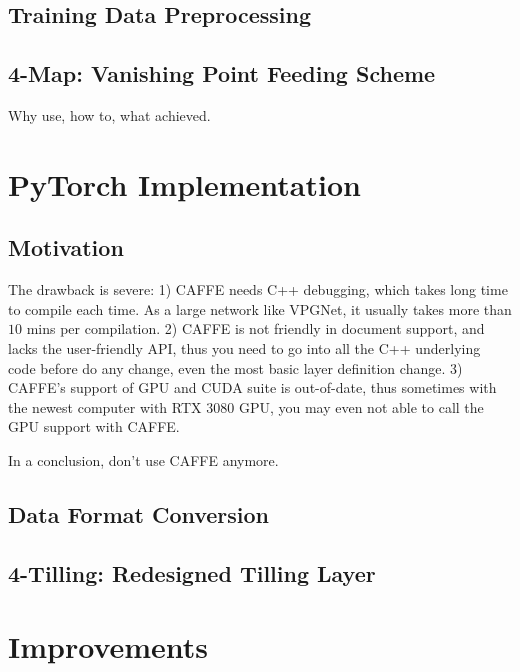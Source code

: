 \begin{spacing}{1.5}
\subsection{Training Data Preprocessing}



\subsection{4-Map: Vanishing Point Feeding Scheme}
\label{subsec:fourmap}

Why use, how to, what achieved.

\section{PyTorch Implementation}
\label{sec:MD_PyTorch}

\subsection{Motivation}

The drawback is severe: 1) CAFFE needs C++ debugging, which takes long time to compile each time. As a large network like VPGNet, it usually takes more than $10$ mins per compilation. 2) CAFFE is not friendly in document support, and lacks the user-friendly API, thus you need to go into all the C++ underlying code before do any change, even the most basic layer definition change. 3) CAFFE's support of GPU and CUDA suite is out-of-date, thus sometimes with the newest computer with RTX 3080 GPU, you may even not able to call the GPU support with CAFFE.

In a conclusion, don't use CAFFE anymore.

\subsection{Data Format Conversion}

\subsection{4-Tilling: Redesigned Tilling Layer}



\section{Improvements}
\label{sec:MD_improvement}
\setlength{\parskip}{0.3in}


\end{spacing}
